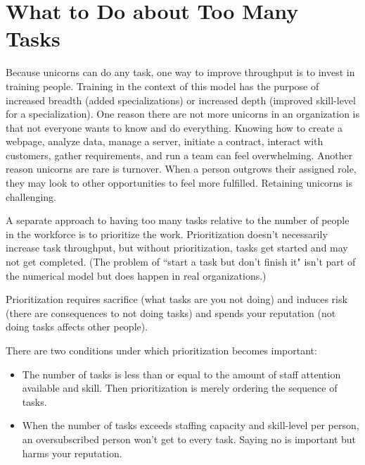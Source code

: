 \section{What to Do about Too Many Tasks}


Because unicorns can do any task, one way to improve throughput is to invest in training people. Training in the context of this model has the purpose of  increased breadth (added specializations) or increased depth (improved skill-level for a specialization). One reason there are not more unicorns in an organization is that not everyone wants to know and do everything. Knowing how to create a webpage, analyze data, manage a server, initiate a contract, interact with customers, gather requirements, and run a team can feel overwhelming. Another reason unicorns are rare is turnover. When a person outgrows their assigned role,  they may look to other opportunities to feel more fulfilled. Retaining unicorns is challenging.

A separate approach to having too many tasks relative to the number of people in the workforce is to prioritize the work. Prioritization doesn't necessarily increase task throughput, but without prioritization, tasks get started and may not get completed. (The problem of ``start a task but don't finish it" isn't part of the numerical model but does happen in real organizations.)

Prioritization requires sacrifice (what tasks are you not doing) and induces risk (there are consequences to not doing tasks) and spends your reputation (not doing tasks affects other people).

There are two conditions under which prioritization becomes important:
\begin{itemize}
    \item The number of tasks is less than or equal to the amount of staff attention available and skill. Then prioritization is merely ordering the sequence of tasks.
    \item When the number of tasks exceeds staffing capacity and skill-level per person, an oversubscribed person won't get to every task. Saying no is important but harms your reputation.
\end{itemize}


